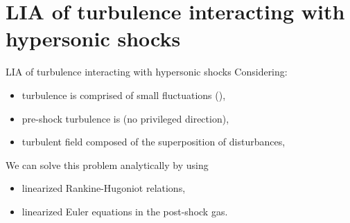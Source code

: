 \documentclass[9pt, aspectratio=1609]{beamer}
\newcommand{\acl}[1]{{\color{cardinalred}{#1}}}
\begin{document}
\section{LIA of turbulence interacting with hypersonic shocks}
\begin{frame}[t]{\large LIA of turbulence interacting with hypersonic shocks}
Considering:
\begin{itemize}
    \item turbulence is comprised of small fluctuations (\acl{weak}),
    \item pre-shock turbulence is \acl{isotropic} (no privileged direction),
    \item turbulent field composed of the superposition of \acl{vortical} disturbances,
\end{itemize}
We can solve this problem analytically by using  
\begin{itemize}
    \item linearized Rankine-Hugoniot relations,
    \item linearized Euler equations in the post-shock gas.
\end{itemize}
\setlength{\leftmargini}{2em}

\vspace{-1cm}
\begin{columns}[c]
    \begin{column}{.5\textwidth}%
    \end{column}%
    \begin{column}{.35\textwidth}


\end{column}
\end{columns}
\end{frame}
\end{document}
